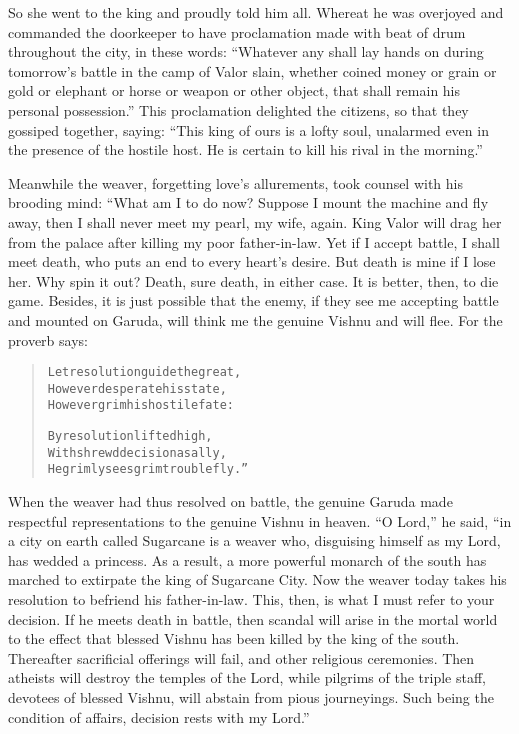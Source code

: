 \documentclass[article, twoside, 14pt]{memoir}
\renewenvironment{verbatim}{%
\begin{quote}%
\vskip -10pt%
\begin{alltt}\normalfont\large}{\end{alltt}%
\end{quote}%
\vskip -10pt
} %
\begin{document}
So she went to the king and proudly told him all. Whereat he was
overjoyed and commanded the doorkeeper to have proclamation made
with beat of drum throughout the city, in these words:
``Whatever any shall lay hands on during tomorrow's battle in the camp of Valor slain, whether coined money or grain or gold or elephant or horse or weapon or other object, that shall remain his personal possession.''
This proclamation delighted the citizens, so that they gossiped
together, saying:
``This king of ours is a lofty soul, unalarmed even in the presence of the hostile host. He is certain to kill his rival in the morning.''

Meanwhile the weaver, forgetting love's allurements, took counsel
with his brooding mind: “What am I to do now? Suppose I mount the
machine and fly away, then I shall never meet my pearl, my wife,
again. King Valor will drag her from the palace after killing my
poor father-in-law. Yet if I accept battle, I shall meet death, who
puts an end to every heart's desire. But death is mine if I
lose her. Why spin it out? Death, sure death, in either case. It is
better, then, to die game. Besides, it is just possible that the
enemy, if they see me accepting battle and mounted on Garuda, will
think me the genuine Vishnu and will flee. For the proverb says:

\begin{verbatim}
Let resolution guide the great,
However desperate his state,
However grim his hostile fate:

By resolution lifted high,
With shrewd decision as ally,
He grimly sees grim trouble fly.”
\end{verbatim}
When the weaver had thus resolved on battle, the genuine Garuda
made respectful representations to the genuine Vishnu in heaven.
``O Lord,'' he said,
``in a city on earth called Sugarcane is a weaver who, disguising himself as my Lord, has wedded a princess. As a result, a more powerful monarch of the south has marched to extirpate the king of Sugarcane City. Now the weaver today takes his resolution to befriend his father-in-law. This, then, is what I must refer to your decision. If he meets death in battle, then scandal will arise in the mortal world to the effect that blessed Vishnu has been killed by the king of the south. Thereafter sacrificial offerings will fail, and other religious ceremonies. Then atheists will destroy the temples of the Lord, while pilgrims of the triple staff, devotees of blessed Vishnu, will abstain from pious journeyings. Such being the condition of affairs, decision rests with my Lord.''
\end{document}
